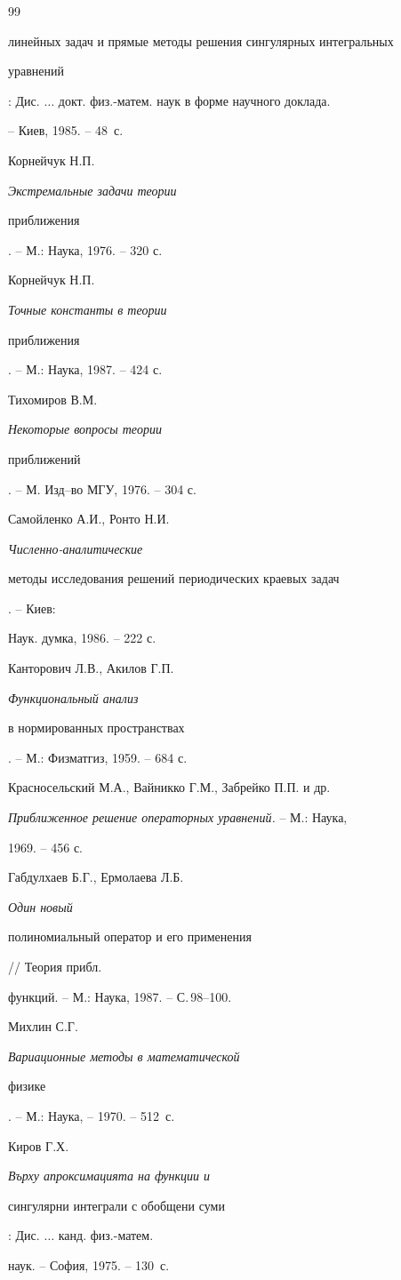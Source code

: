 \begin{thebibliography}{99}
{линейных задач и прямые методы решения сингулярных интегральных


уравнений}: Дис. $\dotsc$ докт. физ.-матем. наук в форме научного доклада.


-- Киев, 1985. -- 48~с.




Корнейчук Н.П. {\it Экстремальные задачи теории


приближения}. -- М.: Наука, 1976. -- 320 с.




Корнейчук Н.П. {\it Точные константы в теории


приближения}. -- М.: Наука, 1987. -- 424 с.




Тихомиров В.М. {\it Некоторые вопросы теории


приближений}. -- М. Изд--во МГУ, 1976. -- 304 с.




Самойленко А.И., Ронто Н.И. {\it Численно-аналитические


методы исследования решений периодических краевых задач}. -- Киев:


Наук. думка, 1986. -- 222 с.




Канторович Л.В., Акилов Г.П. {\it Функциональный анализ


в нормированных пространствах}. -- М.: Физматгиз, 1959. -- 684 с.




Красносельский М.А., Вайникко Г.М., Забрейко П.П. и др.


{\it Приближенное решение операторных уравнений.} -- М.: Наука,


1969. -- 456 с.




Габдулхаев Б.Г., Ермолаева Л.Б. {\it Один новый


полиномиальный оператор и его применения} // Теория прибл.


функций. -- М.: Наука, 1987. -- С.\,98--100.




Михлин С.Г. {\it Вариационные методы в математической


физике}. -- М.: Наука, -- 1970. -- 512~с.




Киров Г.Х. {\it Върху апроксимацията на функции и


сингулярни интеграли с обобщени суми}: Дис. $\dotsc$ канд. физ.-матем.


наук. -- София, 1975. -- 130~с.





\end{thebibliography}





